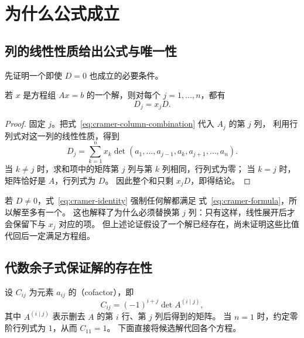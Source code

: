 \documentclass[UTF8,12pt,a4paper,fontset=fandol]{ctexart}
\begin{document}
\section{为什么公式成立}

\subsection{列的线性性质给出公式与唯一性}

先证明一个即使 $D=0$ 也成立的必要条件。

\begin{proposition}
\label{prop:cramer-necessary}
若 $x$ 是方程组 $Ax=b$ 的一个解，则对每个 $j=1,\ldots,n$，都有
\begin{equation}
  D_j=x_jD.
  \label{eq:cramer-identity}
\end{equation}
\end{proposition}

\begin{proof}
固定 $j$。把式~\eqref{eq:cramer-column-combination} 代入 $A_j$ 的第 $j$ 列，
利用行列式对这一列的线性性质，得到
\[
  D_j=\sum_{k=1}^n x_k
  \det(a_1,\ldots,a_{j-1},a_k,a_{j+1},\ldots,a_n).
\]
当 $k\ne j$ 时，求和项中的矩阵第 $j$ 列与第 $k$ 列相同，行列式为零；
当 $k=j$ 时，矩阵恰好是 $A$，行列式为 $D$。
因此整个和只剩 $x_jD$，即得结论。
\end{proof}

若 $D\ne0$，式~\eqref{eq:cramer-identity} 强制任何解都满足
式~\eqref{eq:cramer-formula}，所以解至多有一个。
这也解释了为什么必须替换第 $j$ 列：只有这样，线性展开后才会保留下与 $x_j$ 对应的项。
但上述论证假设了一个解已经存在，尚未证明这些比值代回后一定满足方程组。

\subsection{代数余子式保证解的存在性}

设 $C_{ij}$ 为元素 $a_{ij}$ 的（cofactor），即
\[
  C_{ij}=(-1)^{i+j}\det A^{(i\mid j)},
\]
其中 $A^{(i\mid j)}$ 表示删去 $A$ 的第 $i$ 行、第 $j$ 列后得到的矩阵。
当 $n=1$ 时，约定零阶行列式为 $1$，从而 $C_{11}=1$。
下面直接将候选解代回各个方程。
\end{document}
